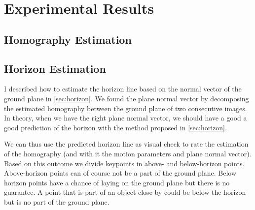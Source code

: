 \chapter{Experimental Results}\label{chap:exp_results}

\section{Homography Estimation}

\section{Horizon Estimation}
I described how to estimate the horizon line based on the normal vector of the ground plane in \autoref{sec:horizon}. We found the plane normal vector by decomposing the estimated homography between the ground plane of two consecutive images. In theory, when we have the right plane normal vector, we should have a good a good prediction of the horizon with the method proposed in \autoref{sec:horizon}.\bigskip

We can thus use the predicted horizon line as visual check to rate the estimation of the homography (and with it the motion parameters and plane normal vector). Based on this outcome we divide keypoints in above- and below-horizon points. Above-horizon points can of course not be a part of the ground plane. Below horizon points have a chance of laying on the ground plane but there is no guarantee. A point that is part of an object close by could be below the horizon but is no part of the ground plane.